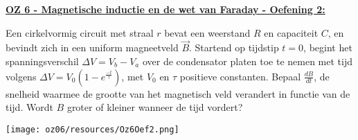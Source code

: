 \textbf{\underline{OZ 6 - Magnetische inductie en de wet van Faraday - Oefening 2:}}
\vspace{0.5cm}

    \begin{minipage}{.79\textwidth}
        Een cirkelvormig circuit met straal $r$ bevat een weerstand $R$ en capaciteit $C$, en
        bevindt zich in een uniform magneetveld $\vec{B}$. Startend op tijdstip $t = 0$, begint het spanningsverschil $\Delta V = V_b - V_a$ over de condensator platen toe te nemen met tijd volgens $\Delta V = V_0 (1- e^{\frac{-t}{\tau}})$, met $V_0$ en $\tau$ positieve constanten. Bepaal $\frac{dB}{dt}$, de snelheid waarmee de grootte van het magnetisch veld verandert in functie van de tijd. Wordt $B$ groter of kleiner wanneer de tijd vordert?
    \end{minipage}
    \hspace{0.3cm}\begin{minipage}{.17\textwidth}
        \texttt{[image: oz06/resources/Oz6Oef2.png]}
    \end{minipage}

    \begin{description}[labelwidth=1.5cm, leftmargin=!]
        \item[Geg. :]
        \item[Gevr. :] 
        \item[Opl. :]
    \end{description}


\vspace{1cm}